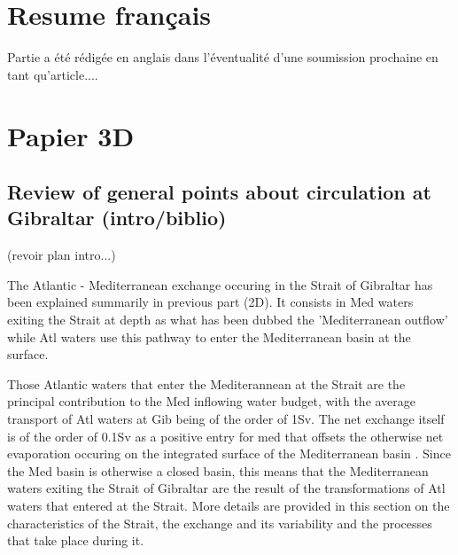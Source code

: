 \hypersetup{pdfborder=0 0 0}




\section{Resume français}

Partie a été rédigée en anglais dans l'éventualité d'une soumission prochaine en tant qu'article....




\section{Papier 3D}
\subsection{Review of general points about circulation at Gibraltar (intro/biblio)}

(revoir plan intro...)


The Atlantic - Mediterranean exchange occuring in the Strait of Gibraltar has been explained summarily in previous part (2D). It consists in Med waters exiting the Strait at depth as what has been dubbed the 'Mediterranean outflow' while Atl waters use this pathway to enter the Mediterranean basin at the surface.

Those Atlantic waters that enter the Mediterannean at the Strait are the principal contribution to the Med inflowing water budget, with the average transport of Atl waters at Gib being of the order of 1Sv. The net exchange itself is of the order of 0.1Sv as a positive entry for med that offsets the otherwise net evaporation occuring on the integrated surface of the Mediterranean basin \citep{bryden_1994}.
Since the Med basin is otherwise a closed basin, this means that the Mediterranean waters exiting the Strait of Gibraltar are the result of the transformations of Atl waters that entered at the Strait.
More details are provided in this section on the characteristics of the Strait, the exchange and its variability and the processes that take place during it.



